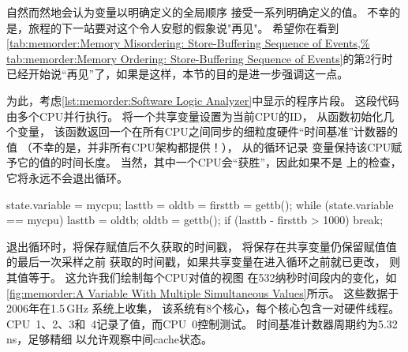 自然而然地会认为变量以明确定义的全局顺序
接受一系列明确定义的值。
不幸的是，旅程的下一站要对这个令人安慰的假象说"再见"。
希望你在看到\cref{tab:memorder:Memory Misordering: Store-Buffering Sequence of Events,%
tab:memorder:Memory Ordering: Store-Buffering Sequence of Events}的第2行时
已经开始说``再见''了，如果是这样，本节的目的是进一步强调这一点。

\begin{fcvref}
为此，考虑\cref{lst:memorder:Software Logic Analyzer}中显示的程序片段。
这段代码由多个CPU并行执行。
将一个共享变量设置为当前CPU的ID，
从函数初始化几个变量，
该函数返回一个在所有CPU之间同步的细粒度硬件``时间基准''计数器的值
（不幸的是，并非所有CPU架构都提供！），
从的循环记录
变量保持该CPU赋予它的值的时间长度。
当然，其中一个CPU会``获胜''，因此如果不是
上的检查，它将永远不会退出循环。
\end{fcvref}

\QuickQuizEnd

\begin{listing}
\begin{fcvlabel}
\begin{VerbatimL}[commandchars=\\\[\]]
state.variable = mycpu;			\lnlbl[setid]
lasttb = oldtb = firsttb = gettb();	\lnlbl[init]
while (state.variable == mycpu) {	\lnlbl[loop:b]
	lasttb = oldtb;
	oldtb = gettb();
	if (lasttb - firsttb > 1000)	\lnlbl[iftmout]
		break;			\lnlbl[break]
}					\lnlbl[loop:e]
\end{VerbatimL}
\end{fcvlabel}
\caption{软件逻辑分析仪}
\label{lst:memorder:Software Logic Analyzer}
\end{listing}

退出循环时，将保存赋值后不久获取的时间戳，
将保存在共享变量仍保留赋值值的最后一次采样之前
获取的时间戳，如果共享变量在进入循环之前就已更改，
则其值等于。
这允许我们绘制每个CPU对值的视图
在532纳秒时间段内的变化，如\cref{fig:memorder:A Variable With Multiple Simultaneous Values}所示。
这些数据于2006年在1.5\,GHz 系统上收集，
该系统有8个核心，每个核心包含一对硬件线程。
CPU~1、2、3和~4记录了值，而CPU~0控制测试。
时间基准计数器周期约为5.32\,ns，足够精细
以允许观察中间cache状态。

